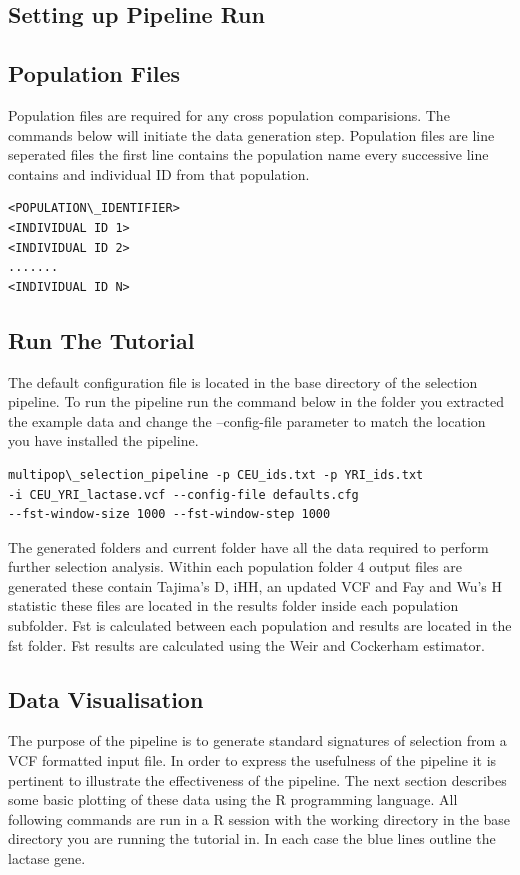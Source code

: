 \subsection{Setting up Pipeline Run}
\subsection{Population Files}
Population files are required for any cross population comparisions. The commands below will initiate the data generation step. Population files are line seperated files the first line contains the population name every successive line contains and individual ID from that population.\\
\begin{verbatim}
<POPULATION\_IDENTIFIER>
<INDIVIDUAL ID 1>
<INDIVIDUAL ID 2>
.......
<INDIVIDUAL ID N>
\end{verbatim}
\subsection{Run The Tutorial}
The default configuration file is located in the base directory of the selection pipeline. To run the pipeline run the command below in the folder you extracted the example data and change the --config-file parameter to match the location you have installed the pipeline.\\
\begin{verbatim}
multipop\_selection_pipeline -p CEU_ids.txt -p YRI_ids.txt 
-i CEU_YRI_lactase.vcf --config-file defaults.cfg
--fst-window-size 1000 --fst-window-step 1000
\end{verbatim}
The generated folders and current folder have all the data required to perform further selection analysis. Within each population folder 4 output files are generated these contain Tajima's D, iHH, an updated VCF and Fay and Wu's H statistic these files are located in the results folder inside each population subfolder. Fst is calculated between each population and results are located in the fst folder. Fst results are calculated using the Weir and Cockerham estimator.
\subsection{Data Visualisation}
The purpose of the pipeline is to generate standard signatures of selection from a VCF formatted input file. In order to express the usefulness of the pipeline it is pertinent to illustrate the effectiveness of the pipeline. The next section describes some basic plotting of these data using the R programming language. All following commands are run in a R session with the working directory in the base directory you are running the tutorial in. In each case the blue lines outline the lactase gene.
